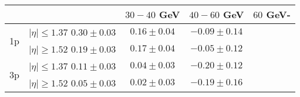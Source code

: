 \centering
\begin{tabular}{|c|c|c|c|c|} \hline
                  &  & $30-40$ GeV & $40-60$ GeV & $60$ GeV-  \\ \hline
\multirow{2}{*}{1p} &$\lvert \eta \rvert \leq 1.37$ $0.30\pm0.03$ & $0.16\pm0.04$ & $-0.09\pm0.14$\\\cline{2-5}
                    &$\lvert \eta \rvert \geq 1.52$ $0.19\pm0.03$ & $0.17\pm0.04$ & $-0.05\pm0.12$\\\hline 
\multirow{2}{*}{3p} &$\lvert \eta \rvert \leq 1.37$ $0.11\pm0.03$ & $0.04\pm0.03$ & $-0.20\pm0.12$\\\cline{2-5}
                    &$\lvert \eta \rvert \geq 1.52$ $0.05\pm0.03$ & $0.02\pm0.03$ & $-0.19\pm0.16$\\\hline  
\end{tabular}